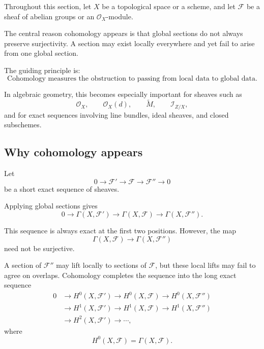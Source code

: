 \documentclass[12pt,a4paper]{article}
\theoremstyle{notespace}
\begin{document}
Throughout this section, let \(X\) be a topological space or a scheme, and let
\(\mathcal{F}\) be a sheaf of abelian groups or an \(\mathcal{O}_{X}\)-module.

The central reason cohomology appears is that global sections do not always
preserve surjectivity. A section may exist locally everywhere and yet fail to
arise from one global section.

The guiding principle is:
\[
\boxed{
	\text{Cohomology measures the obstruction to passing from local data to global data.}
}
\]

In algebraic geometry, this becomes especially important for sheaves such as
\[
\mathcal{O}_{X},
\qquad
\mathcal{O}_{X}(d),
\qquad
\widetilde{M},
\qquad
\mathcal{I}_{Z/X},
\]
and for exact sequences involving line bundles, ideal sheaves, and closed
subschemes.

\subsection{Why cohomology appears}

Let
\[
0
\longrightarrow
\mathcal{F}'
\longrightarrow
\mathcal{F}
\longrightarrow
\mathcal{F}''
\longrightarrow
0
\]
be a short exact sequence of sheaves.

Applying global sections gives
\[
0
\longrightarrow
\Gamma(X,\mathcal{F}')
\longrightarrow
\Gamma(X,\mathcal{F})
\longrightarrow
\Gamma(X,\mathcal{F}'').
\]

This sequence is always exact at the first two positions. However, the map
\[
\Gamma(X,\mathcal{F})
\longrightarrow
\Gamma(X,\mathcal{F}'')
\]
need not be surjective.

A section of \(\mathcal{F}''\) may lift locally to sections of
\(\mathcal{F}\), but these local lifts may fail to agree on overlaps.
Cohomology completes the sequence into the long exact sequence
\[
\begin{aligned}
	0
	&\longrightarrow
	H^{0}(X,\mathcal{F}')
	\longrightarrow
	H^{0}(X,\mathcal{F})
	\longrightarrow
	H^{0}(X,\mathcal{F}'') \\
	&\longrightarrow
	H^{1}(X,\mathcal{F}')
	\longrightarrow
	H^{1}(X,\mathcal{F})
	\longrightarrow
	H^{1}(X,\mathcal{F}'') \\
	&\longrightarrow
	H^{2}(X,\mathcal{F}')
	\longrightarrow
	\cdots,
\end{aligned}
\]
where
\[
H^{0}(X,\mathcal{F})=\Gamma(X,\mathcal{F}).
\]
\end{document}
